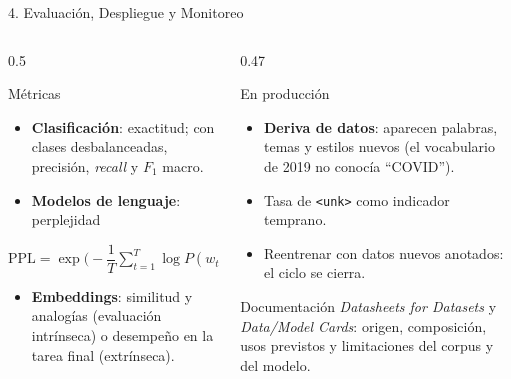 \documentclass[aspectratio=169, 10pt]{beamer}
\newcommand{\tok}[1]{\texttt{#1}}
\newcommand{\formula}[1]{%
	\begin{tcolorbox}[colback=UCMBlue!8, colframe=UCMBlue, arc=4pt,
		boxsep=2pt, left=6pt, right=6pt, top=3pt, bottom=3pt]
		#1
	\end{tcolorbox}
}
\begin{document}
\begin{frame}{4. Evaluaci\'on, Despliegue y Monitoreo}

	\begin{columns}[T]
		\begin{column}{0.5\textwidth}
			\begin{block}{M\'etricas}
				\small
				\begin{itemize}
					\item \textbf{Clasificaci\'on}: exactitud; con clases desbalanceadas, precisi\'on, \textit{recall} y $F_1$ macro.
					\item \textbf{Modelos de lenguaje}: perplejidad
				\end{itemize}
				\formula{\centering $\mathrm{PPL} = \exp\Big(-\dfrac{1}{T}\displaystyle\sum_{t=1}^{T} \log P(w_t \mid w_{<t})\Big)$}
				\begin{itemize}
					\small
					\item \textbf{Embeddings}: similitud y analog\'ias (evaluaci\'on intr\'inseca) o desempe\~no en la tarea final (extr\'inseca).
				\end{itemize}
			\end{block}
		\end{column}

		\begin{column}{0.47\textwidth}
			\begin{block}{En producci\'on}
				\small
				\begin{itemize}
					\item \textbf{Deriva de datos}: aparecen palabras, temas y estilos nuevos (el vocabulario de 2019 no conoc\'ia ``COVID'').
					\item Tasa de \tok{<unk>} como indicador temprano.
					\item Reentrenar con datos nuevos anotados: el ciclo se cierra.
				\end{itemize}
			\end{block}

			\begin{block}{Documentaci\'on}
				\small
				\textit{Datasheets for Datasets} y \textit{Data/Model Cards}: origen, composici\'on, usos previstos y limitaciones del corpus y del modelo.
			\end{block}
		\end{column}
	\end{columns}

\end{frame}

\end{document}
